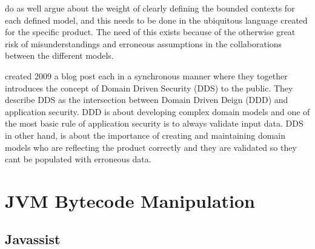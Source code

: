 \textcite{evans_2015} do as well argue about the weight of clearly defining the bounded contexts for each defined model, and this needs to be done in the ubiquitous language created for the specific product. The need of this exists because of the otherwise great risk of misunderstandings and erroneous assumptions in the collaborations between the different models. \parencite{millett_2015}

\textcite{Wilander2009, Johnsson2009} created 2009 a blog post each in a synchronous manner where they together introduces the concept of Domain Driven Security (DDS) to the public. They describe DDS as the intersection between Domain Driven Deign (DDD) and application security. DDD is about developing complex domain models and one of the most basic rule of application security is to always validate input data. DDS in other hand, is about the importance of creating and maintaining domain models who are reflecting the product correctly and they are validated so they cant be populated with erroneous data. \parencite{Wilander2009, Johnsson2009, Arnor2016, Stendahl2016}


\section{JVM Bytecode Manipulation}


\subsection{Javassist}

